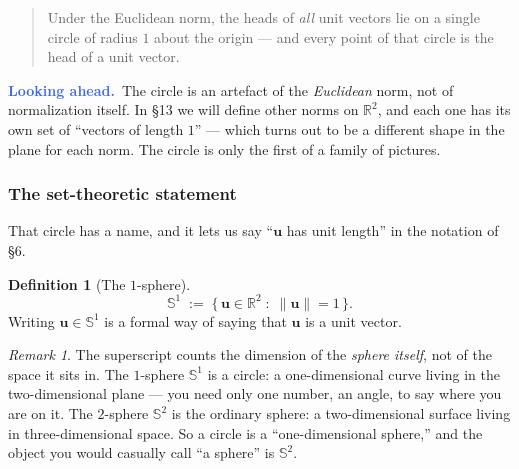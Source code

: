 \documentclass[11pt]{article}
\theoremstyle{definition}
\newtheorem{defn}{Definition}
\theoremstyle{remark}
\newtheorem*{rmk}{Remark}
\newcommand{\lookahead}{\par\smallskip\noindent
  \textbf{\sffamily\textcolor{RoyalBlue}{Looking ahead.}}\ \ignorespaces}
\newcommand{\R}{\mathbb{R}}
\newcommand{\vc}[1]{\mathbf{#1}}
\newcommand{\norm}[1]{\lVert #1\rVert}
\newcommand{\uv}[1]{\hat{\vc{#1}}}                 %
\newcommand{\Sph}[1]{\mathbb{S}^{#1}}              %
\newcommand{\lattice}[4]{%
  \draw[step=1cm,gray!25,very thin] (#1,#3) grid (#2,#4);
  \draw[axisline] (#1,0) -- (#2+0.45,0) node[right,font=\scriptsize,black]{$x$};
  \draw[axisline] (0,#3) -- (0,#4+0.45) node[above,font=\scriptsize,black]{$y$};
}
\begin{document}
\begin{quote}
Under the Euclidean norm, the heads of \emph{all} unit vectors lie on a single
circle of radius $1$ about the origin --- and every point of that circle is the
head of a unit vector.
\end{quote}

\begin{center}
\end{center}

\lookahead The circle is an artefact of the \emph{Euclidean} norm, not of
normalization itself. In \S13 we will define other norms on $\R^{2}$, and each
one has its own set of ``vectors of length $1$'' --- which turns out to be a
different shape in the plane for each norm. The circle is only the first of a
family of pictures.

\subsubsection*{The set-theoretic statement}
That circle has a name, and it lets us say ``$\vc{u}$ has unit length'' in the
notation of \S6.

\begin{defn}[The $1$-sphere]
\[
  \Sph{1} \;:=\; \bigl\{\, \vc{u}\in\R^{2} \;:\; \norm{\vc{u}}=1 \,\bigr\}.
\]
Writing $\vc{u}\in\Sph{1}$ is a formal way of saying that $\vc{u}$ is a unit
vector.
\end{defn}

\begin{rmk}
The superscript counts the dimension of the \emph{sphere itself}, not of the
space it sits in. The $1$-sphere $\Sph{1}$ is a circle: a one-dimensional curve
living in the two-dimensional plane --- you need only one number, an angle, to
say where you are on it. The $2$-sphere $\Sph{2}$ is the ordinary sphere: a
two-dimensional surface living in three-dimensional space. So a circle is a
``one-dimensional sphere,'' and the object you would casually call ``a sphere''
is $\Sph{2}$.
\end{rmk}
\end{document}
